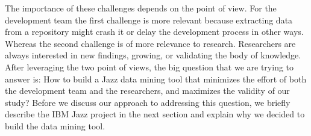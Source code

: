 The importance of these challenges depends on the point of view. For the
development team the first challenge is more relevant because extracting data
from a repository might crash it or delay the development process in other ways.
Whereas the second challenge is of more relevance to research. Researchers are
always interested in new findings, growing, or validating the body of knowledge.
After leveraging the two point of views, the big question that we are trying to
answer is: How to build a Jazz data mining tool that minimizes the effort of
both the development team and the researchers, and maximizes the validity of our
study? Before we discuss our approach to addressing this question, we briefly
describe the IBM Jazz project in the next section and explain why we
decided to build the data mining tool.
